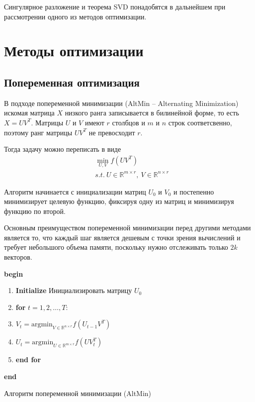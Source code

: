 \documentclass[oneside,final,14pt]{extreport} %
\begin{document}
Сингулярное разложение и теорема SVD понадобятся в дальнейшем при рассмотрении одного из методов оптимизации.

\chapter{Методы оптимизации}
\section{Попеременная оптимизация}


В подходе попеременной минимизации (AltMin -- Alternating Minimization) искомая матрица $X$ низкого ранга записывается в билинейной форме, то есть $X = UV^T$. Матрицы $U$ и $V$ имеют $r$ столбцов и $m$ и $n$ строк соответсвенно, поэтому ранг матрицы $UV^T$ не превосходит $r$.

Тогда задачу можно переписать в виде
\begin{equation}
	\begin{aligned}
		&\min_{U,V} f(UV^T) \\ &s.t. \ U \in \mathbb{R}^{m \times r}, \  V \in \mathbb{R}^{n \times r} 
	\end{aligned}
\end{equation}

Алгоритм начинается с инициализации матриц $U_0$ и $V_0$ и постепенно минимизирует целевую функцию, фиксируя одну из матриц и минимизируя функцию по второй.

Основным преимуществом попеременной минимизации перед другими методами является то, что каждый шаг является дешевым с точки зрения вычислений и требует небольшого объема памяти, поскольку нужно отслеживать только $2k$ векторов. 

\begin{algorithm}
\textbf{begin}
\begin{enumerate}
	\item \textbf{Initialize} Инициализировать матрицу $U_0$
	\item \textbf{for} $t = 1,2,\ldots, T$:
	\item $V_t = \text{argmin}_{V \in \mathbb{R}^{n \times r}} f(U_{t-1} V^T)$
	\item $U_t = \text{argmin}_{U \in \mathbb{R}^{m \times r}} f(U V_t^T)$
	\item\textbf{end for}
\end{enumerate}
\textbf{end}
\caption{Алгоритм попеременной минимизации (AltMin)}
\end{algorithm}
\end{document}
